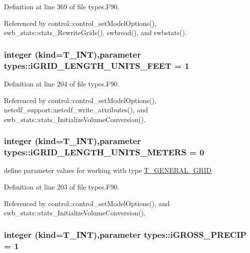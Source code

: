 Definition at line 369 of file types.F90.



Referenced by control::control\_\-setModelOptions(), swb\_\-stats::stats\_\-RewriteGrids(), swbread(), and swbstats().

\hypertarget{namespacetypes_a09fb47af7ad4b30ae025dd1241f3081f}{
\subsubsection[{iGRID\_\-LENGTH\_\-UNITS\_\-FEET}]{\setlength{\rightskip}{0pt plus 5cm}integer (kind={\bf T\_\-INT}),parameter {\bf types::iGRID\_\-LENGTH\_\-UNITS\_\-FEET} = 1}}
\label{namespacetypes_a09fb47af7ad4b30ae025dd1241f3081f}


Definition at line 204 of file types.F90.



Referenced by control::control\_\-setModelOptions(), netcdf\_\-support::netcdf\_\-write\_\-attributes(), and swb\_\-stats::stats\_\-InitializeVolumeConversion().

\hypertarget{namespacetypes_addaf796ce1bbf5d055d4b236092e0aaf}{
\subsubsection[{iGRID\_\-LENGTH\_\-UNITS\_\-METERS}]{\setlength{\rightskip}{0pt plus 5cm}integer (kind={\bf T\_\-INT}),parameter {\bf types::iGRID\_\-LENGTH\_\-UNITS\_\-METERS} = 0}}
\label{namespacetypes_addaf796ce1bbf5d055d4b236092e0aaf}


define parameter values for working with type \hyperlink{typetypes_1_1_t___g_e_n_e_r_a_l___g_r_i_d}{T\_\-GENERAL\_\-GRID} 



Definition at line 203 of file types.F90.



Referenced by control::control\_\-setModelOptions(), and swb\_\-stats::stats\_\-InitializeVolumeConversion().

\hypertarget{namespacetypes_a3c6dbb348b35ea04c6da1808e4eeb082}{
\subsubsection[{iGROSS\_\-PRECIP}]{\setlength{\rightskip}{0pt plus 5cm}integer (kind={\bf T\_\-INT}),parameter {\bf types::iGROSS\_\-PRECIP} = 1}}
\label{namespacetypes_a3c6dbb348b35ea04c6da1808e4eeb082}


